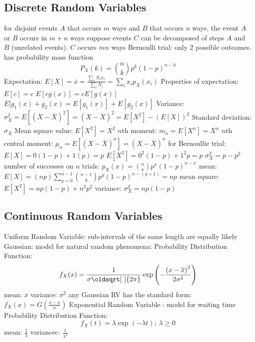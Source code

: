 \documentclass[a4paper,11pt]{article}
\renewcommand*{\sqrt}[2][\ ]{\oldsqrt[#1]{#2}}
\begin{document}
	\subsection{Discrete Random Variables}
	\begin{outline}[enumerate]
		\1 for disjoint events $A$ that occurs $m$ ways and $B$ that occurs $n$ ways, the event $A$ or $B$ occurs in $m + n$ ways 
		\1 suppose events $C$ can be decomposed of steps $A$ and $B$ (unrelated events). $C$ occurs $mn$ ways
		\1 Bernoulli trial: only 2 possible outcomes. has probability mass function 
		\begin{equation}
			P_{X}(k) = \binom{n}{k}p^{k}\left(1 - p\right)^{n - k}
		\end{equation}
		\1 Expectation: $E[X] = \overline{x} = \frac{\sum_{i} N_{i}x_{i}}{\sum_{i} N_{i}} = \sum_{i} x_{i}p_{X}(x_{i})$
		\1 Properties of expectation:
			\2 $E[c] = c$
			\2 $E[cg(x)] = cE[g(x)]$
			\2 $E[g_{1}(x) + g_{2}(x) = E[g_{1}(x)] + E[g_{2}(x)]$
		\1 Variance: $\sigma_{X}^2 = E\left[\left(X - \overline{X}\right)^{2}\right] = \overline{\left(X - \overline{X}\right)^{2}} = E\left[X^{2}\right] - \left(E\left[X\right]\right)^{2}$ 	
		\1 Standard deviation: $\sigma_{X}$
		\1 Mean square value: $E[X^{2}] = \overline{X^{2}}$
		\1 $n$th moment: $m_{n} = E\left[X^{n}\right] = \overline{X^{n}}$
		\1 $n$th central moment: $\mu_{n} = E\left[\left(X - \overline{X}\right)^{n}\right] = \overline{\left(X - \overline{X}\right)^{n}}$	
		\1 for Bernoullie trial:
			\2 $E\left[X\right] = 0(1 - p) + 1(p) = p$
			\2 $E\left[X^{2}\right] = 0^{2}(1 - p) + 1^{2}p = p$
			\2 $\sigma_{X}^{2} = p - p^{2}$
			\2 number of successes on $n$ trials: $p_{X}(x) = \binom{n}{x}p^{x}\left(1 - p\right)^{n - x}$
			\2 mean: $E\left[X\right] = (np)\sum\limits_{y = 0}^{n - 1} \binom{n - 1}{y}p^y\left(1 - p\right)^{n - \left(y + 1\right)} = np$
			\2 mean square: $E\left[X^{2}\right] = np\left(1 - p\right) + n^{2}p^{2}$
			\2 variance: $\sigma_{X}^{2} = np\left(1 - p\right)$
	\end{outline}

	\subsection{Continuous Random Variables}
	\begin{outline}[enumerate]
		\1 Uniform Random Variable: sub-intervals of the same length are equally likely
		\1 Gaussian: model for natural random phenomena:
			\2 Probability Distribution Function: 
			\begin{equation}
				f_{X}(x) = \frac{1}{\sigma\sqrt{2\pi}}\exp\left(-\frac{\left(x - \overline{x}\right)^{2}}{2\sigma^2}\right)
			\end{equation} 
			\2 mean: $\overline{x}$
			\2 variance: $\sigma^{2}$
		\1 any Gaussian RV has the standard form: $f_{X}(x) = G\left(\frac{x - \overline{x}}{\sigma}\right)$
		\1 Exponential Random Variable : model for waiting time
		 	\2 Probability Distribution Function: 
		 	\begin{equation}
		 		f_{X}(t) = \lambda\exp\left(-\lambda t\right);~\lambda \geq 0
		 	\end{equation}
		 	\2 mean: $\frac{1}{\lambda}$
		 	\2 variancec: $\frac{1}{\lambda^{2}}$	
	\end{outline}
\end{document}
